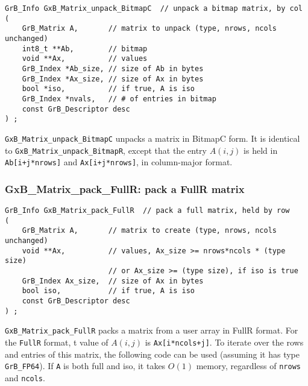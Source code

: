 \documentclass[12pt]{article}
\begin{document}
{\begin{mdframed}[userdefinedwidth=6in]
{\footnotesize
\begin{verbatim}
GrB_Info GxB_Matrix_unpack_BitmapC  // unpack a bitmap matrix, by col
(
    GrB_Matrix A,       // matrix to unpack (type, nrows, ncols unchanged)
    int8_t **Ab,        // bitmap
    void **Ax,          // values
    GrB_Index *Ab_size, // size of Ab in bytes
    GrB_Index *Ax_size, // size of Ax in bytes
    bool *iso,          // if true, A is iso
    GrB_Index *nvals,   // # of entries in bitmap
    const GrB_Descriptor desc
) ;
\end{verbatim}
} \end{mdframed}

\verb'GxB_Matrix_unpack_BitmapC' unpacks a matrix in BitmapC form.
It is identical to \verb'GxB_Matrix_unpack_BitmapR', except that the
entry $A(i,j)$ is held in \verb'Ab[i+j*nrows]' and \verb'Ax[i+j*nrows]',
in column-major format.

\newpage
\subsubsection{{\sf GxB\_Matrix\_pack\_FullR:} pack a FullR matrix}
\label{matrix_pack_fullr}

\begin{mdframed}[userdefinedwidth=6in]
{\footnotesize
\begin{verbatim}
GrB_Info GxB_Matrix_pack_FullR  // pack a full matrix, held by row
(
    GrB_Matrix A,       // matrix to create (type, nrows, ncols unchanged)
    void **Ax,          // values, Ax_size >= nrows*ncols * (type size)
                        // or Ax_size >= (type size), if iso is true
    GrB_Index Ax_size,  // size of Ax in bytes
    bool iso,           // if true, A is iso
    const GrB_Descriptor desc
) ;
\end{verbatim}
} \end{mdframed}

\verb'GxB_Matrix_pack_FullR' packs a matrix from a user array in FullR format.
For the \verb'FullR' format, t value of $A(i,j)$ is \verb'Ax[i*ncols+j]'.  To
iterate over the rows and entries of this matrix, the following code can be
used (assuming it has type \verb'GrB_FP64').  If \verb'A' is both full and iso,
it takes $O(1)$ memory, regardless of \verb'nrows' and \verb'ncols'.

}
\end{document}
